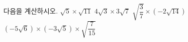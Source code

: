 다음을 계산하시오.
 $\sqrt{5}\times\sqrt{11}$
 $4\sqrt{3}\times 3\sqrt{7}$
 $\sqrt{\dfrac{3}{7}}\times(-2\sqrt{14})$
 $(-5\sqrt{6})\times(-3\sqrt{5})\times\sqrt{\dfrac{7}{15}}$
